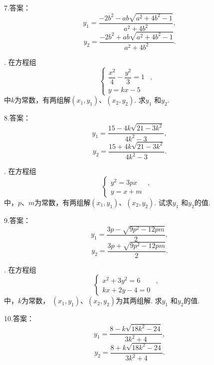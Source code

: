 \documentclass[UTF8]{ctexart}
\begin{document}
    
\noindent 7.答案： $$y_1=\dfrac{-2b^2-ab\sqrt{a^2+4b^2-1}}{a^2+4b^2},$$
     $$y_2=\dfrac{-2b^2+ab\sqrt{a^2+4b^2-1}}{a^2+4b^2}.$$
      \newpage
    
. 在方程组\begin{equation*}
    \left\{
    \begin{aligned}
    \dfrac{x^2}{4}-\dfrac{y^2}{3}=1 &,& \\
     y=kx-5& &
    \end{aligned}
    \right.
    \end{equation*}中$k$为常数，有两组解$(x_1,y_1)$、$(x_2,y_2)$. 求$y_1$ 和$y_2$.\vspace{3cm}
    
\noindent 8.答案： $$y_1=\dfrac{15-4k\sqrt{21-3k^2}}{4k^2-3},$$
     $$y_2=\dfrac{15+4k\sqrt{21-3k^2}}{4k^2-3}.$$
      \newpage
    
. 在方程组\begin{equation*}
    \left\{
    \begin{aligned}
    y^2=3px &,& \\
     y=x+m& &
    \end{aligned}
    \right.
    \end{equation*}中，$p$、$m$为常数，有两组解$(x_1,y_1)$、$(x_2,y_2)$. 试求$y_1$ 和$y_2$的值.\vspace{3cm}
    
\noindent 9.答案： $$y_1=\dfrac{3p-\sqrt{9p^2-12pm}}{2},$$
     $$y_2=\dfrac{3p+\sqrt{9p^2-12pm}}{2}.$$
      \newpage
    
. 在方程组\begin{equation*}
    \left\{
    \begin{aligned}
     x^2+3y^2=6&,& \\
     kx+2y-4=0& &
    \end{aligned}
    \right.
    \end{equation*}中，$k$为常数， $(x_1,y_1)$、$(x_2,y_2)$为其两组解. 求$y_1$ 和$y_2$的值.\vspace{3cm}
    
\noindent 10.答案： $$y_1=\dfrac{8-k\sqrt{18k^2-24}}{3k^2+4},$$
     $$y_2=\dfrac{8+k\sqrt{18k^2-24}}{3k^2+4}.$$
      \newpage
    
\end{document}
